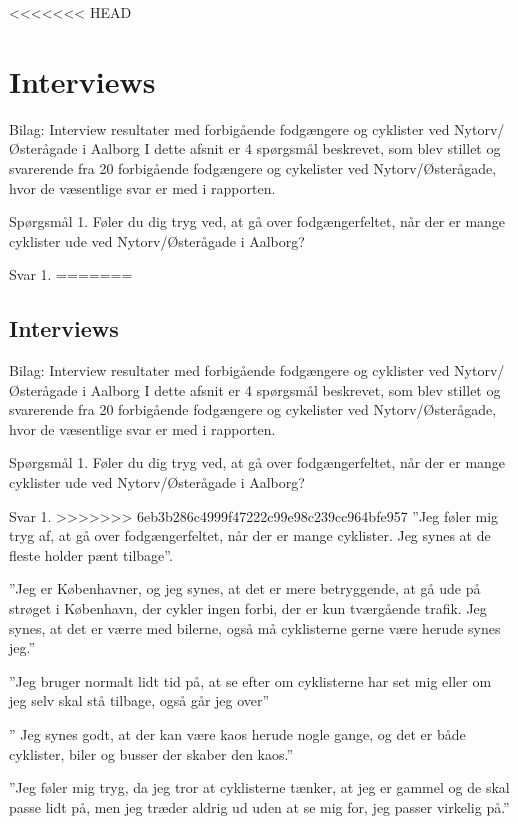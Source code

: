 \appendix
\label{appendix_start}
<<<<<<< HEAD
\begin{appendics}
  \chapter{Interviews}
  \label{chap:interviews}
  Bilag: Interview resultater med forbigående fodgængere og cyklister ved Nytorv/Østerågade i Aalborg
I dette afsnit er 4 spørgsmål beskrevet, som blev stillet og svarerende fra 20 forbigående fodgængere og cykelister ved Nytorv/Østerågade, hvor de væsentlige svar er med i rapporten.

Spørgsmål 1.
Føler du dig tryg ved, at gå over fodgængerfeltet, når der er mange cyklister ude ved Nytorv/Østerågade i Aalborg?

Svar 1.
=======

\begin{appendics}
  \chapter{Interviews}
  \label{chap:interviews}
 Bilag: Interview resultater med forbigående fodgængere og cyklister ved Nytorv/Østerågade i Aalborg 
I dette afsnit er 4 spørgsmål beskrevet, som blev stillet og svarerende fra 20 forbigående fodgængere og cykelister ved Nytorv/Østerågade, hvor de væsentlige svar er med i rapporten.  
 
Spørgsmål 1.  
Føler du dig tryg ved, at gå over fodgængerfeltet, når der er mange cyklister ude ved Nytorv/Østerågade i Aalborg?

Svar 1. 
>>>>>>> 6eb3b286c4999f47222c99e98c239cc964bfe957
”Jeg føler mig tryg af, at gå over fodgængerfeltet, når der er mange cyklister. Jeg synes at de fleste holder pænt tilbage”.

”Jeg er Københavner, og jeg synes, at det er mere betryggende, at gå ude på strøget i København, der cykler ingen forbi, der er kun tværgående trafik. Jeg synes, at det er værre med bilerne, også må cyklisterne gerne være herude synes jeg.”

”Jeg bruger normalt lidt tid på, at se efter om cyklisterne har set mig eller om jeg selv skal stå tilbage, også går jeg over”

” Jeg synes godt, at der kan være kaos herude nogle gange, og det er både cyklister, biler og busser der skaber den kaos.”

”Jeg føler mig tryg, da jeg tror at cyklisterne tænker, at jeg er gammel og de skal passe lidt på, men jeg træder aldrig ud uden at se mig for, jeg passer virkelig på.”


\end{appendics}
\end{appendics}
